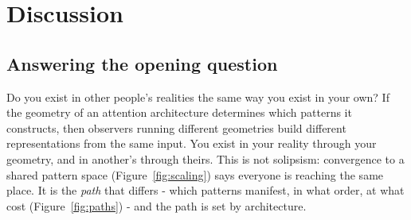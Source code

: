 \section{Discussion}

\subsection{Answering the opening question}

Do you exist in other people's realities the same way you exist in your own? If the geometry of an attention architecture determines which patterns it constructs, then observers running different geometries build different representations from the same input. You exist in your reality through your geometry, and in another's through theirs. This is not solipsism: convergence to a shared pattern space (Figure~\ref{fig:scaling}) says everyone is reaching the same place. It is the \textit{path} that differs - which patterns manifest, in what order, at what cost (Figure~\ref{fig:paths}) - and the path is set by architecture.

